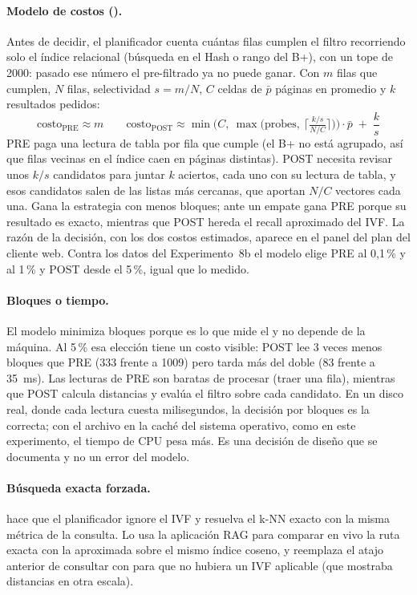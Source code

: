 \paragraph{Modelo de costos ().} Antes de decidir, el
planificador cuenta cuántas filas cumplen el filtro recorriendo solo el índice relacional
(búsqueda en el Hash o rango del B+), con un tope de 2000: pasado ese número el
pre-filtrado ya no puede ganar. Con $m$ filas que cumplen, $N$ filas, selectividad
$s=m/N$, $C$ celdas de $\bar p$ páginas en promedio y $k$ resultados pedidos:
\[
\text{costo}_{\text{PRE}} \approx m
\qquad
\text{costo}_{\text{POST}} \approx \min\!\Big(C,\ \max\!\big(\text{probes},\ \big\lceil \tfrac{k/s}{N/C}\big\rceil\big)\Big)\cdot \bar p \;+\; \frac{k}{s}
\]
PRE paga una lectura de tabla por fila que cumple (el B+ no está agrupado, así que filas
vecinas en el índice caen en páginas distintas). POST necesita revisar unos $k/s$
candidatos para juntar $k$ aciertos, cada uno con su lectura de tabla, y esos candidatos
salen de las listas más cercanas, que aportan $N/C$ vectores cada una. Gana la estrategia
con menos bloques; ante un empate gana PRE porque su resultado es exacto, mientras que
POST hereda el recall aproximado del IVF. La razón de la decisión, con los dos costos
estimados, aparece en el panel del plan del cliente web. Contra los datos del
Experimento~8b el modelo elige PRE al 0,1\,\% y al 1\,\% y POST desde el 5\,\%, igual que
lo medido.

\paragraph{Bloques o tiempo.} El modelo minimiza bloques porque es lo que mide el
 y no depende de la máquina. Al 5\,\% esa elección tiene un costo
visible: POST lee 3 veces menos bloques que PRE (333 frente a 1009) pero tarda más del
doble (83 frente a 35~ms). Las lecturas de PRE son baratas de procesar (traer una fila),
mientras que POST calcula distancias y evalúa el filtro sobre cada candidato. En un disco
real, donde cada lectura cuesta milisegundos, la decisión por bloques es la correcta; con
el archivo en la caché del sistema operativo, como en este experimento, el tiempo de CPU
pesa más. Es una decisión de diseño que se documenta y no un error del modelo.

\paragraph{Búsqueda exacta forzada.}  hace que el
planificador ignore el IVF y resuelva el k-NN exacto con la misma métrica de la consulta.
Lo usa la aplicación RAG para comparar en vivo la ruta exacta con la aproximada sobre el
mismo índice coseno, y reemplaza el atajo anterior de consultar con \code{<->} para que no
hubiera un IVF aplicable (que mostraba distancias en otra escala).

